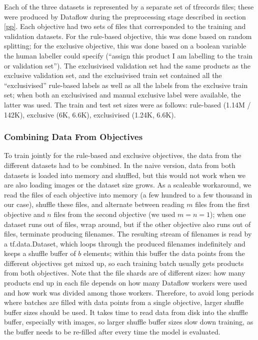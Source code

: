Each of the three datasets is represented by a separate set of tfrecords files; these were produced by Dataflow during the preprocessing stage described in section \ref{pp}.
Each objective had two sets of files that corresponded to the training and validation datasets.
For the rule-based objective, this was done based on random splitting; for the exclusive objective, this was done based on a boolean variable the human labeller could specify (``assign this product I am labelling to the train or validation set'').
The exclusivised validation set had the same products as the exclusive validation set, and the exclusivised train set contained all the ``exclusivised'' rule-based labels as well as all the labels from the exclusive train set; when both an exclusivised and manual exclusive label were available, the latter was used.
The train and test set sizes were as follows: rule-based (1.14M / 142K), exclusive (6K, 6.6K), exclusivised (1.24K, 6.6K).

\subsubsection{Combining Data From Objectives}

To train jointly for the rule-based and exclusive objectives, the data from the different datasets had to be combined.
In the naive version, data from both datasets is loaded into memory and shuffled, but this would not work when we are also loading images or the dataset size grows.
As a scaleable workaround, we read the files of each objective into memory (a few hundred to a few thousand in our case), shuffle these files, and alternate between reading $m$ files from the first objective and $n$ files from the second objective (we used $m = n = 1$); when one dataset runs out of files, wrap around, but if the other objective also runs out of files, terminate producing filenames.
The resulting stream of filenames is read by a tf.data.Dataset, which loops through the produced filenames indefinitely and keeps a shuffle buffer of $b$ elements; within this buffer the data points from the different objectives get mixed up, so each training batch usually gets products from both objectives.
Note that the file shards are of different sizes: how many products end up in each file depends on how many Dataflow workers were used and how work was divided among those workers.
Therefore, to avoid long periods where batches are filled with data points from a single objective, larger shuffle buffer sizes should be used.
It takes time to read data from disk into the shuffle buffer, especially with images, so larger shuffle buffer sizes slow down training, as the buffer needs to be re-filled after every time the model is evaluated.

